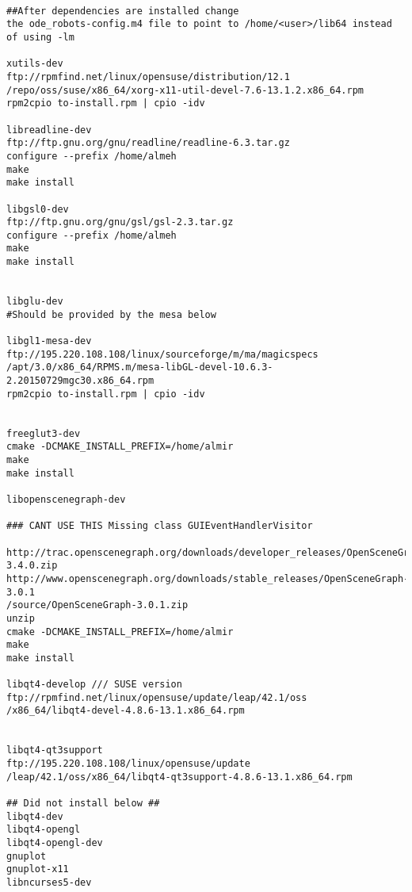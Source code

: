 \begin{lstlisting}

##After dependencies are installed change 
the ode_robots-config.m4 file to point to /home/<user>/lib64 instead of using -lm

xutils-dev 
ftp://rpmfind.net/linux/opensuse/distribution/12.1
/repo/oss/suse/x86_64/xorg-x11-util-devel-7.6-13.1.2.x86_64.rpm
rpm2cpio to-install.rpm | cpio -idv

libreadline-dev  
ftp://ftp.gnu.org/gnu/readline/readline-6.3.tar.gz
configure --prefix /home/almeh
make
make install

libgsl0-dev 
ftp://ftp.gnu.org/gnu/gsl/gsl-2.3.tar.gz
configure --prefix /home/almeh
make
make install


libglu-dev 
#Should be provided by the mesa below

libgl1-mesa-dev 
ftp://195.220.108.108/linux/sourceforge/m/ma/magicspecs
/apt/3.0/x86_64/RPMS.m/mesa-libGL-devel-10.6.3-2.20150729mgc30.x86_64.rpm
rpm2cpio to-install.rpm | cpio -idv


freeglut3-dev  
cmake -DCMAKE_INSTALL_PREFIX=/home/almir
make 
make install

libopenscenegraph-dev 

### CANT USE THIS Missing class GUIEventHandlerVisitor

http://trac.openscenegraph.org/downloads/developer_releases/OpenSceneGraph-3.4.0.zip
http://www.openscenegraph.org/downloads/stable_releases/OpenSceneGraph-3.0.1
/source/OpenSceneGraph-3.0.1.zip
unzip
cmake -DCMAKE_INSTALL_PREFIX=/home/almir
make
make install

libqt4-develop /// SUSE version
ftp://rpmfind.net/linux/opensuse/update/leap/42.1/oss
/x86_64/libqt4-devel-4.8.6-13.1.x86_64.rpm


libqt4-qt3support 
ftp://195.220.108.108/linux/opensuse/update
/leap/42.1/oss/x86_64/libqt4-qt3support-4.8.6-13.1.x86_64.rpm

## Did not install below ##
libqt4-dev 
libqt4-opengl 
libqt4-opengl-dev 
gnuplot 
gnuplot-x11 
libncurses5-dev

\end{lstlisting}

